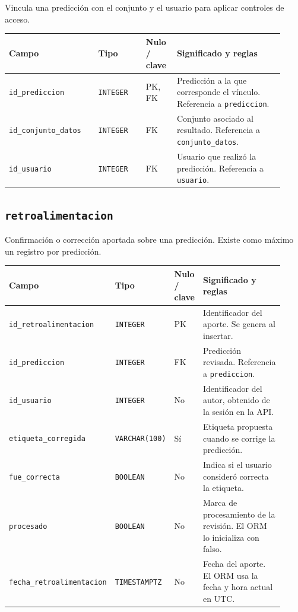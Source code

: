 Vincula una predicción con el conjunto y el usuario para aplicar controles de acceso.

\noindent
\begin{tabular}{@{}p{0.30\linewidth}p{0.16\linewidth}p{0.10\linewidth}p{0.36\linewidth}@{}}
\hline
\textbf{Campo} & \textbf{Tipo} & \textbf{Nulo / clave} & \textbf{Significado y reglas} \\
\hline
\texttt{id\_\allowbreak{}prediccion} & \texttt{INTEGER} & PK, FK & Predicción a la que corresponde el vínculo. Referencia a \texttt{prediccion}. \\
\texttt{id\_\allowbreak{}conjunto\_\allowbreak{}datos} & \texttt{INTEGER} & FK & Conjunto asociado al resultado. Referencia a \texttt{conjunto\_\allowbreak{}datos}. \\
\texttt{id\_\allowbreak{}usuario} & \texttt{INTEGER} & FK & Usuario que realizó la predicción. Referencia a \texttt{usuario}. \\
\hline
\end{tabular}

\subsection*{\texttt{retroalimentacion}}

Confirmación o corrección aportada sobre una predicción. Existe como máximo un registro por predicción.

\noindent
\begin{tabular}{@{}p{0.30\linewidth}p{0.16\linewidth}p{0.10\linewidth}p{0.36\linewidth}@{}}
\hline
\textbf{Campo} & \textbf{Tipo} & \textbf{Nulo / clave} & \textbf{Significado y reglas} \\
\hline
\texttt{id\_\allowbreak{}retroalimentacion} & \texttt{INTEGER} & PK & Identificador del aporte. Se genera al insertar. \\
\texttt{id\_\allowbreak{}prediccion} & \texttt{INTEGER} & FK & Predicción revisada. Referencia a \texttt{prediccion}. \\
\texttt{id\_\allowbreak{}usuario} & \texttt{INTEGER} & No & Identificador del autor, obtenido de la sesión en la API. \\
\texttt{etiqueta\_\allowbreak{}corregida} & \texttt{VARCHAR(100)} & Sí & Etiqueta propuesta cuando se corrige la predicción. \\
\texttt{fue\_\allowbreak{}correcta} & \texttt{BOOLEAN} & No & Indica si el usuario consideró correcta la etiqueta. \\
\texttt{procesado} & \texttt{BOOLEAN} & No & Marca de procesamiento de la revisión. El ORM lo inicializa con falso. \\
\texttt{fecha\_\allowbreak{}retroalimentacion} & \texttt{TIMESTAMPTZ} & No & Fecha del aporte. El ORM usa la fecha y hora actual en UTC. \\
\hline
\end{tabular}

